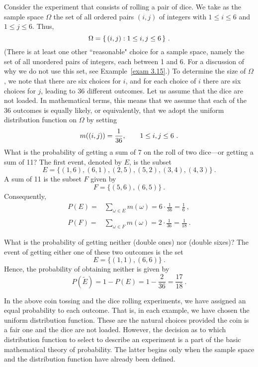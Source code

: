 \begin{example}\label{exam 1.11}
Consider the experiment that consists of rolling a pair of dice.  We take as
the
sample space $\Omega$ the set of all ordered pairs $(i,j)$ of
integers with $1\leq i\leq 6$ and $1\leq j\leq 6$.  Thus,
$$
\Omega = \{\,(i,j):1\leq i,\space j \leq 6\,\}\ .
$$
(There is at least one other ``reasonable" choice for a sample space, namely the
set of all unordered pairs of integers, each between 1 and 6.  For a discussion
of why we do not use this set, see Example~\ref{exam 3.15}.)
To determine the size of $\Omega$, we note that there are six choices for $i$,
and for each choice of $i$ there are six choices for $j$, leading to 36 different
outcomes.  Let us assume that the dice are not loaded.  In mathematical terms, this
means
that we assume that each of the 36 outcomes is equally likely, or
equivalently,
that we adopt the uniform distribution function on $\Omega$ by setting
$$
m((i,j)) = \frac1{36},\qquad 1\leq i,\space j \leq 6\ .
$$
What is the probability of getting a sum of 7 on the roll of two dice---or
getting a sum of 11?  The first event, denoted by $E$, is the subset
$$
E = \{(1,6),(6,1),(2,5),(5,2),(3,4),(4,3)\}\ .
$$
A sum of 11 is the subset $F$ given by
$$
F = \{(5,6),(6,5)\}\ .
$$
Consequently,
$$\begin{array}{ll}
P(E) = &\sum_{\omega \in E} m(\omega) = 6\cdot\frac1{36} = \frac16\ , \\
       &                                                            \\
P(F) = &\sum_{\omega \in F} m(\omega) = 2\cdot\frac1{36} = \frac1{18}\ .
\end{array}
$$

What is the probability of getting neither  (double ones)
nor
 (double sixes)?  The event of getting either one of these two
outcomes is the set
$$
E = \{(1,1),(6,6)\}\ .
$$
Hence, the probability of obtaining neither is given by
$$
P(\tilde E) = 1 - P(E) = 1 - \frac2{36} = \frac{17}{18}\ .
$$
\end{example}
\par
In the above coin tossing and the dice rolling experiments, we have assigned
an equal probability to each outcome.  That is, in each example, we have chosen
the uniform distribution function.  These are the natural choices provided the
coin is a fair one and the dice are not loaded.  However, the decision as
to which distribution function to select to describe an experiment is  a part
of the basic mathematical theory of probability.  The latter begins only when
the
sample space and the distribution function have already been defined.

